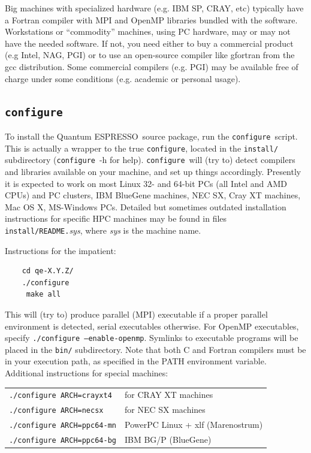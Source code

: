 \documentclass[12pt,a4paper]{article}
\def\qe{{\sc Quantum ESPRESSO}}
\def\configure{\texttt{configure}}
\begin{document}
Big machines with
specialized hardware (e.g. IBM SP, CRAY, etc) typically have a
Fortran compiler with MPI and OpenMP libraries bundled with
the software. Workstations or ``commodity'' machines, using PC
hardware, may or may not have the needed software. If not, you need
either to buy a commercial product (e.g Intel, NAG, PGI) or to
use an open-source compiler like gfortran from the gcc distribution.
Some commercial compilers (e.g. PGI) may be available free of charge 
under some conditions (e.g. academic or personal usage).

\subsection{\configure}

To install the \qe\ source package, run the \configure{}ript. This is actually a wrapper to the true \configure,
located in the \texttt{install/} subdirectory (\configure\ -h for help).
\configure\ will (try to) detect compilers and libraries available on
your machine, and set up things accordingly. Presently it is expected
to work on most Linux 32- and 64-bit PCs (all Intel and AMD CPUs) and
PC clusters, IBM BlueGene machines, NEC SX, Cray XT
machines, Mac OS X, MS-Windows PCs. Detailed but sometimes outdated
installation instructions for specific HPC machines may be found in
files \texttt{install/README.}{\em sys},
where {\em sys} is the machine name.

Instructions for the impatient:
\begin{verbatim}
    cd qe-X.Y.Z/
    ./configure
     make all
\end{verbatim}
This will (try to) produce parallel (MPI) executable if a proper parallel
environment is detected, serial executables otherwise. For OpenMP executables,
specify \texttt{./configure --enable-openmp}. Symlinks to executable programs
will be placed in the \texttt{bin/}
subdirectory. Note that both C and Fortran compilers must be in your execution
path, as specified in the PATH environment variable.
Additional instructions for special machines:

\begin{tabular}{ll}
    \texttt{./configure ARCH=crayxt4}& for CRAY XT machines \\
    \texttt{./configure ARCH=necsx}   & for NEC SX machines \\
    \texttt{./configure ARCH=ppc64-mn}& PowerPC Linux + xlf (Marenostrum) \\
    \texttt{./configure ARCH=ppc64-bg}& IBM BG/P (BlueGene)
\end{tabular}
\end{document}

